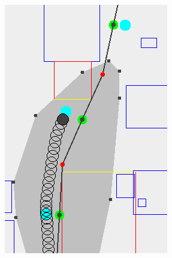 \begin{figure}[h]
	\centering
	\begin{subfigure}[t]{0.30\columnwidth}
        		\includegraphics[width=\textwidth]{img/transition-suboptimal-pre}
        		\caption{}
        		 \label{fig:transition-suboptimal-pre}
	\end{subfigure}	
	\hfill
	\begin{subfigure}[t]{0.30\columnwidth}

\end{subfigure}
\end{figure}
